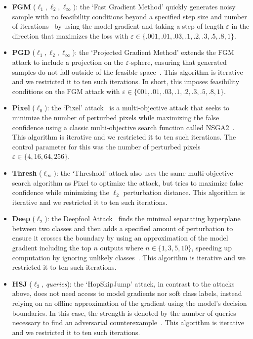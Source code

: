 \begin{itemize}
    \item \textbf{FGM} ($\ell_1, \ell_2, \ell_{\infty}$): the `Fast Gradient Method' quickly generates noisy sample with no feasibility conditions beyond a specified step size and number of iterations~\citep{fgm} by using the model gradient and taking a step of length $\varepsilon$ in the direction that maximizes the loss with $\varepsilon \in \{.001,.01,.03,.1,.2,.3,.5,.8,1\}$.

    \item \textbf{PGD}  ($\ell_1, \ell_2, \ell_{\infty}$):  the `Projected Gradient Method' extends the FGM attack to include a projection on the $\varepsilon$-sphere, ensuring that generated samples do not fall outside of the feasible space~\citep{madry2017towards}. This algorithm is iterative and we restricted it to ten such iterations. In short, this imposes feasibility conditions on the FGM attack with $\varepsilon \in \{001,.01,.03,.1,.2,.3,.5,.8,1\}$.

    \item \textbf{Pixel} ($\ell_0$): the `Pixel' attack~\citep{pixelattack} is a multi-objective attack that seeks to minimize the number of perturbed pixels  while maximizing the false confidence using a classic multi-objective search function called NSGA2~\citep{nsga2}. This algorithm is iterative and we restricted it to ten such iterations. The control parameter for this was the number of perturbed pixels $\varepsilon \in \{4, 16, 64, 256\}$.

    \item \textbf{Thresh} ($\ell_{\infty})$: the `Threshold' attack also uses the same multi-objective search algorithm as Pixel to optimize the attack, but tries to maximize false confidence while minimizing the $\ell_2$ perturbation distance. This algorithm is iterative and we restricted it to ten such iterations.

    \item \textbf{Deep} ($\ell_2$): the Deepfool Attack~\citep{deepfool} finds the minimal separating hyperplane between two classes and then adds a specified amount of perturbation to ensure it crosses the boundary by using an approximation of the model gradient including the top $n$ outputs where $n \in \{1,3,5,10\}$, speeding up computation by ignoring unlikely classes~\citep{deepfool}. This algorithm is iterative and we restricted it to ten such iterations.

    \item \textbf{HSJ} ($\ell_2$, \textit{queries}): the `HopSkipJump' attack, in contrast to the attacks above, does not need access to model gradients nor soft class labels, instead relying on an offline approximation of the gradient using the model's decision boundaries. In this case, the strength is denoted by the number of queries necessary to find an adversarial counterexample~\citep{hopskipjump}. This algorithm is iterative and we restricted it to ten such iterations.

\end{itemize}




